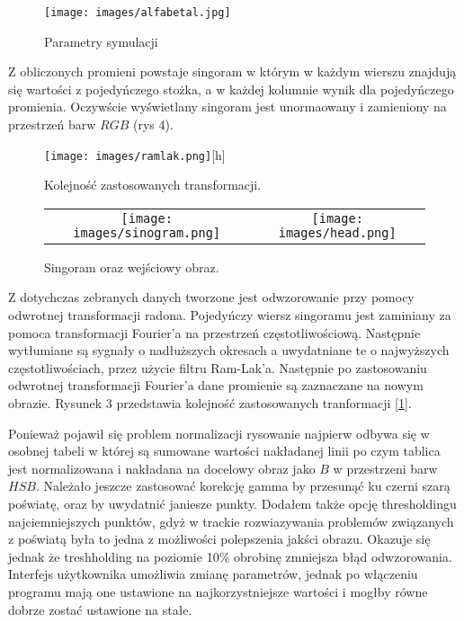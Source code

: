 \documentclass{article}
\begin{document}
\begin{figure}[h]
\centering
\texttt{[image: images/alfabetal.jpg]}
\caption{Parametry symulacji}
\end{figure}

Z obliczonych promieni powstaje singoram w którym w każdym wierszu znajdują się wartości z pojedyńczego stożka, a w każdej kolumnie wynik dla pojedyńczego promienia. Oczywście wyświetlany singoram jest unormaowany i zamieniony na przestrzeń barw $RGB$ (rys 4).

\begin{figure}[h!]
\centering
\texttt{[image: images/ramlak.png]}[h]
\caption{Kolejność zastosowanych transformacji.}
\end{figure}

\begin{figure}[h]
\centering
\begin{tabular}{cc}
\texttt{[image: images/sinogram.png]} &
\texttt{[image: images/head.png]}
\end{tabular}
\caption{Singoram oraz wejściowy obraz.}
\end{figure}



Z dotychczas zebranych danych tworzone jest odwzorowanie przy pomocy odwrotnej transformacji radona. Pojedyńczy wiersz singoramu jest zaminiany za pomoca transformacji Fourier'a na przestrzeń częstotliwościową. Następnie wytłumiane są sygnały o nadłuższych okresach a uwydatniane te o najwyższych częstotliwościach, przez użycie filtru Ram-Lak'a. Następnie po zastosowaniu odwrotnej transformacji Fourier'a dane promienie są zaznaczane na nowym obrazie. Rysunek 3 przedstawia kolejność zastosowanych tranformacji \hyperlink{ramlak}{[1]}.


Ponieważ pojawił się problem normalizacji rysowanie najpierw odbywa się w osobnej tabeli w której są sumowane wartości nakładanej linii po czym tablica jest normalizowana i nakładana na docelowy obraz jako $B$ w przestrzeni barw $HSB$. Należało jeszcze zastosować korekcję gamma by przesunąć ku czerni szarą poświatę, oraz by uwydatnić janiesze punkty. Dodałem także opcję thresholdingu najciemniejszych punktów, gdyż  w trackie rozwiazywania problemów związanych z poświatą była to jedna z możliwości polepszenia jakści obrazu. Okazuje się jednak że treshholding na poziomie 10\% obrobinę zmniejsza błąd odwzorowania.  Interfejs użytkownika umożliwia zmianę parametrów, jednak po włączeniu programu mają one ustawione na najkorzystniejsze wartości i mogłby równe dobrze zostać ustawione na stałe.
\end{document}
